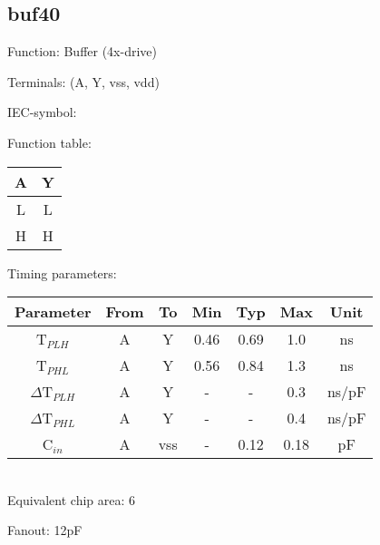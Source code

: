 \subsection{buf40}
Function: Buffer (4x-drive)

Terminals: (A, Y, vss, vdd)


IEC-symbol:
\begin{figure}[bth]
\end{figure}

\begin{minipage}[t]{0.3\textwidth}
Function table:\\

\begin{tabular}{|c||c|}
\hline
A	&Y\\
\hline
L	&L\\
H	&H\\
\hline
\end{tabular}
\end{minipage}
\hfill
\begin{minipage}[t]{0.6\textwidth}
Timing parameters:\\

\begin{tabular}{|c|cc|ccc|c|}
\hline
Parameter               &From            &To   	&Min	&Typ	&Max    &Unit\\
\hline
T$_{PLH}$               &A     		&Y      &0.46	&0.69	&1.0    &ns\\
T$_{PHL}$               &A    		&Y      &0.56	&0.84	&1.3    &ns\\
\hline
$\Delta$T$_{PLH}$       &A           	&Y      &-	&-	&0.3    &ns/pF\\
$\Delta$T$_{PHL}$       &A           	&Y      &-	&-	&0.4    &ns/pF\\
\hline
C$_{in}$                &A	    	&vss    &-	&0.12	&0.18   &pF\\
\hline
\end{tabular}
\end{minipage}
\\

Equivalent chip area: 6

Fanout: 12pF

\vspace{1cm}
\clearpage
